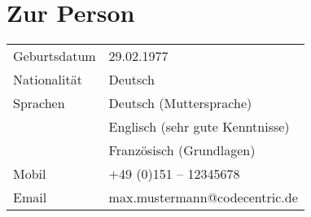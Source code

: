 \section*{Zur Person}
\begin{tabular}{@{}p{6cm}p{10cm}}
Geburtsdatum 	& 29.02.1977\\
Nationalität 	& Deutsch\\
Sprachen 	& Deutsch (Muttersprache)\\
		& Englisch (sehr gute Kenntnisse)\\
		& Französisch (Grundlagen)\\
Mobil		& +49 (0)151 – 12345678\\
Email		& max.mustermann@codecentric.de
\end{tabular}

